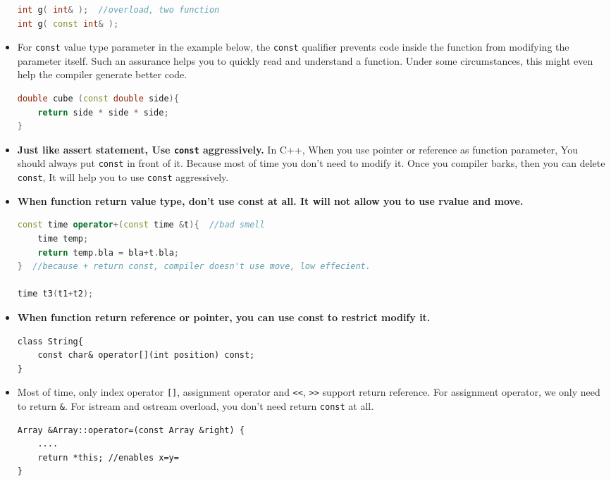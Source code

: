 \documentclass[a4paper,11pt,twoside]{book}
\begin{document}
\begin{itemize}
\begin{lstlisting}[frame=single, language=c++]
int g( int& );  //overload, two function
int g( const int& );
\end{lstlisting}
	
	\item For \texttt{const} value type parameter in the example below, the \texttt{const} qualifier prevents code inside the function from modifying the parameter itself. Such an assurance helps you to quickly read and understand a function. Under some circumstances, this might even help the compiler generate better code. 
\begin{lstlisting}[frame=single, language=c++]
double cube (const double side){
	return side * side * side;
}
\end{lstlisting}
	
	\item \textbf{Just like assert statement, Use \texttt{const} aggressively.}  In C++, When you use pointer or reference as function parameter, You should always put \texttt{const} in front of it. Because most of time you don't need to modify it.  Once you compiler barks, then you can delete \texttt{const}, It will help you to use \texttt{const} aggressively.
	
	
	
	\item \textbf{When function return value type, don't use const at all. It will not allow you to use rvalue and move. }
\begin{lstlisting}[frame=single, language=c++]
const time operator+(const time &t){  //bad smell
	time temp;
	return temp.bla = bla+t.bla;
}  //because + return const, compiler doesn't use move, low effecient.

time t3(t1+t2);
\end{lstlisting}
	
	\item \textbf{When function return reference or pointer, you can use const to restrict modify it.}
\begin{lstlisting}[numbers=none]
class String{
	const char& operator[](int position) const; 
}
\end{lstlisting}
	
	\item Most of time, only index operator \verb=[]=, assignment operator and \verb|<<|, \verb|>>| support return reference. For assignment operator, we only need to return \texttt{\&}.  For istream and ostream overload, you don't need return \texttt{const} at all. 
\begin{lstlisting}[numbers=none]
Array &Array::operator=(const Array &right) {
	....
	return *this; //enables x=y= 
}
\end{lstlisting} 
	

\end{itemize}
\end{document}
